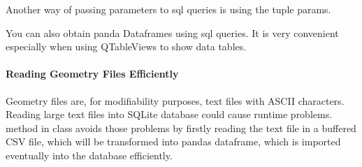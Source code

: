 \documentclass[letterpaper,10pt,english]{sphinxmanual}
\begin{document}
Another way of passing parameters to sql queries is using the tuple params.

\begin{sphinxVerbatim}[commandchars=\\\{\}]
  
  
    
 
\end{sphinxVerbatim}

You can also obtain panda Dataframes using sql queries. It is very convenient especially when using QTableViews to show
data tables.

\begin{sphinxVerbatim}[commandchars=\\\{\}]
  
   
 
\end{sphinxVerbatim}


\paragraph{Reading Geometry Files Efficiently}
\label{\detokenize{implementation:reading-geometry-files-efficiently}}
Geometry files are, for modifiability purposes, text files with ASCII characters.
Reading large text files into SQLite database could cause run\sphinxhyphen{}time problems.
 method in  class avoids those problems by firstly reading the text file in a buffered CSV file,
which will be transformed into pandas dataframe, which is imported eventually into the database efficiently.
\end{document}
